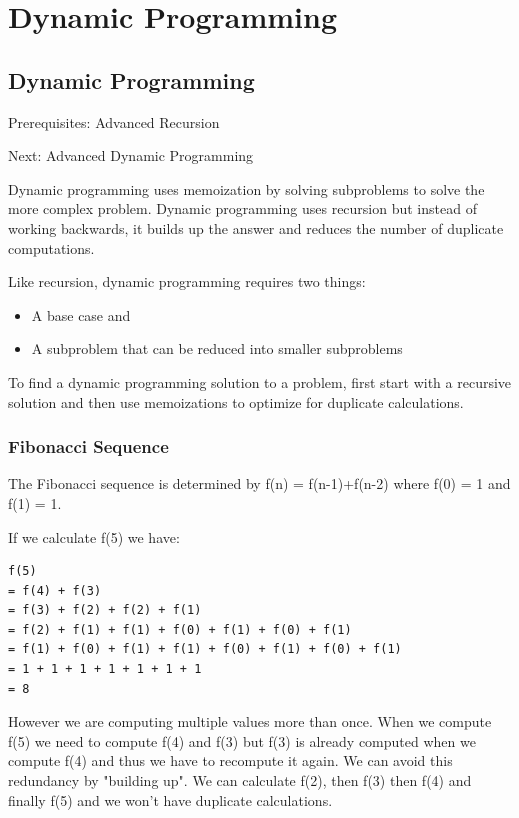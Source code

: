 \documentclass[11pt,oneside]{book}
\begin{document}
    \chapter{ Dynamic Programming }
        \section{ Dynamic Programming }
        

Prerequisites: Advanced Recursion

Next: Advanced Dynamic Programming

Dynamic programming uses memoization by solving subproblems to solve the more complex problem. Dynamic programming uses recursion but instead of working backwards, it builds up the answer and reduces the number of duplicate computations.

Like recursion, dynamic programming requires two things:

\begin{itemize}
\item A base case and
\item A subproblem that can be reduced into smaller subproblems 
\end{itemize}

To find a dynamic programming solution to a problem, first start with a recursive solution and then use memoizations to optimize for duplicate calculations.

\subsection{Fibonacci Sequence}

The Fibonacci sequence is determined by f(n) = f(n-1)+f(n-2) where f(0) = 1 and f(1) = 1.

If we calculate f(5) we have:

\begin{lstlisting}
f(5) 
= f(4) + f(3) 
= f(3) + f(2) + f(2) + f(1) 
= f(2) + f(1) + f(1) + f(0) + f(1) + f(0) + f(1) 
= f(1) + f(0) + f(1) + f(1) + f(0) + f(1) + f(0) + f(1) 
= 1 + 1 + 1 + 1 + 1 + 1 + 1
= 8
\end{lstlisting}

However we are computing multiple values more than once. When we compute f(5) we need to compute f(4) and f(3) but f(3) is already computed when we compute f(4) and thus we have to recompute it again. We can avoid this redundancy by "building up". We can calculate f(2), then f(3) then f(4) and finally f(5) and we won't have duplicate calculations.
\end{document}
